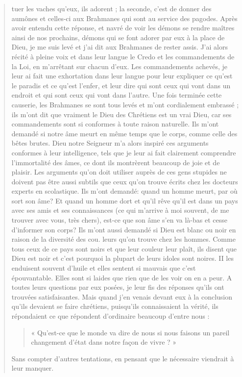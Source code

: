\begin{quote}
tuer les vaches qu'eux, ils adorent ; la seconde, c'est de donner des
aumônes et celles-ci aux Brahmanes qui sont au service des pagodes.
Après avoir entendu cette réponse, et navré de voir les démons
se rendre maîtres ainsi de nos prochains, démons qui se font adorer
par eux à la place de Dieu, je me suis levé et j'ai dit aux Brahmanes
de rester assis. J'ai alors récité à pleine voix et dans leur langue
le Credo et les commandements de la Loi, en m'arrêtant sur
chacun d'eux. Les commandements achevés, je leur ai fait une
exhortation dans leur langue pour leur expliquer ce qu'est le paradis
et ce qu'est l'enfer, et leur dire qui sont ceux qui vont dans un
endroit et qui sont ceux qui vont dans l'autre. Une fois terminée
cette causerie, les Brahmanes se sont tous levés et m'ont cordialement
embrassé ; ils m'ont dit que vraiment le Dieu des Chrétiens
est un vrai Dieu, car ses commandements sont si conformes à toute
raison naturelle.
Ils m'ont demandé si notre âme meurt en même temps que le
corps, comme celle des bêtes brutes. Dieu notre Seigneur m'a alors
inspiré ces arguments conformes à leur intelligence, tels que je leur
ai fait clairement comprendre l'immortalité des âmes, ce dont ils
montrèrent beaucoup de joie et de plaisir. Les arguments qu'on
doit utiliser auprès de ces gens stupides ne doivent pas être aussi
subtils que ceux qu'on trouve écrits chez les docteurs experts en
scolastique. Ils m'ont demandé: quand un homme meurt, par où
sort son âme? Et quand un homme dort et qu'il rêve qu'il est dans
un pays avec ses amis et ses connaissances (ce qui m'arrive à moi
souvent, de me trouver avec vous, très chers), est-ce que son âme
s'en va là-bas et cesse d'informer son corps? Ils m'ont aussi
demandé si Dieu est blanc ou noir en raison de la diversité des cou.
leurs qu'on trouve chez les hommes. Comme tous ceux de ce pays
sont noirs et que leur couleur leur plaît, ils disent que Dieu est noir
et c'est pourquoi la plupart de leurs idoles sont noires. II les enduisent
souvent d'huile et elles sentent si mauvais que c'est épouvantable.
Elles sont si laides que rien que de les voir on en a peur. A
toutes leurs questions par eux posées, je leur fis des réponses qu'ils
ont trouvées satisfaisantes. Mais quand j'en venais devant eux à
la conclusion qu'ils devaient se faire chrétiens, puisqu'ils connaissaient
la vérité, ils répondaient ce que répondent d'ordinaire
    beaucoup d'entre nous : \begin{quote}
        « Qu'est-ce que le monde va dire de nous
si nous faisons un pareil changement d'état dans notre façon de
vivre ? » 
    \end{quote}Sans compter d'autres tentations, en pensant que le nécessaire
viendrait à leur manquer.



\end{quote}
